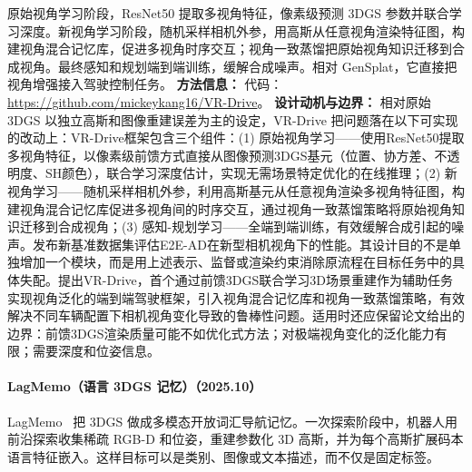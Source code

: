 原始视角学习阶段，ResNet50 提取多视角特征，像素级预测 3DGS 参数并联合学习深度。新视角学习阶段，随机采样相机外参，用高斯从任意视角渲染特征图，构建视角混合记忆库，促进多视角时序交互；视角一致蒸馏把原始视角知识迁移到合成视角。最终感知和规划端到端训练，缓解合成噪声。相对 GenSplat，它直接把视角增强接入驾驶控制任务。
\textbf{方法信息：} 代码：\url{https://github.com/mickeykang16/VR-Drive}。
\textbf{设计动机与边界：} 相对原始 3DGS 以独立高斯和图像重建误差为主的设定，VR-Drive 把问题落在以下可实现的改动上：VR-Drive框架包含三个组件：(1) 原始视角学习——使用ResNet50提取多视角特征，以像素级前馈方式直接从图像预测3DGS基元（位置、协方差、不透明度、SH颜色），联合学习深度估计，实现无需场景特定优化的在线推理；(2) 新视角学习——随机采样相机外参，利用高斯基元从任意视角渲染多视角特征图，构建视角混合记忆库促进多视角间的时序交互，通过视角一致蒸馏策略将原始视角知识迁移到合成视角；(3) 感知-规划学习——全端到端训练，有效缓解合成引起的噪声。发布新基准数据集评估E2E-AD在新型相机视角下的性能。其设计目的不是单独增加一个模块，而是用上述表示、监督或渲染约束消除原流程在目标任务中的具体失配。提出VR-Drive，首个通过前馈3DGS联合学习3D场景重建作为辅助任务实现视角泛化的端到端驾驶框架，引入视角混合记忆库和视角一致蒸馏策略，有效解决不同车辆配置下相机视角变化导致的鲁棒性问题。适用时还应保留论文给出的边界：前馈3DGS渲染质量可能不如优化式方法；对极端视角变化的泛化能力有限；需要深度和位姿信息。
\paragraph{LagMemo（语言 3DGS 记忆）（2025.10）}
LagMemo~\cite{2510_24118} 把 3DGS 做成多模态开放词汇导航记忆。一次探索阶段中，机器人用前沿探索收集稀疏 RGB-D 和位姿，重建参数化 3D 高斯，并为每个高斯扩展码本语言特征嵌入。这样目标可以是类别、图像或文本描述，而不仅是固定标签。

